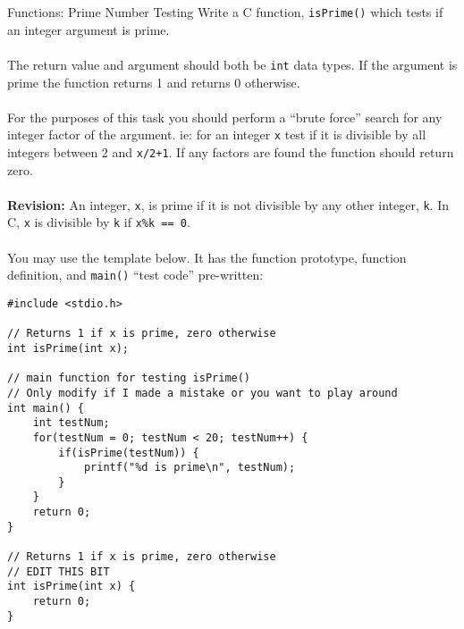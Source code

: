 \documentclass{lab}
\begin{document}
\pagebreak
\begin{task}{Functions: Prime Number Testing}{}
Write a C function, \texttt{isPrime()} which tests if an integer argument is prime.
\\~\\
The return value and argument should both be \texttt{int} data types. If the argument is prime the function returns 1 and returns 0 otherwise.
\\~\\
For the purposes of this task you should perform a ``brute force'' search for any integer factor of the argument. ie: for an integer \texttt{x} test if it is divisible by all integers between 2 and \texttt{x/2+1}. If any factors are found the function should return zero.
\\~\\
\textbf{Revision:} An integer, \texttt{x}, is prime if it is not divisible by any other integer, \texttt{k}. In C, \texttt{x} is divisible by \texttt{k} if \texttt{x\%k == 0}.
\\~\\
You may use the template below. It has the function prototype, function definition, and \texttt{main()} ``test code'' pre-written:
\begin{lstlisting}[style=Ctable]
#include <stdio.h>

// Returns 1 if x is prime, zero otherwise
int isPrime(int x);

// main function for testing isPrime()
// Only modify if I made a mistake or you want to play around
int main() {
	int testNum;
	for(testNum = 0; testNum < 20; testNum++) {
		if(isPrime(testNum)) {
			printf("%d is prime\n", testNum);
		}
	}
	return 0;
}

// Returns 1 if x is prime, zero otherwise
// EDIT THIS BIT
int isPrime(int x) {
	return 0;
}
\end{lstlisting}
\end{task}
\end{document}
